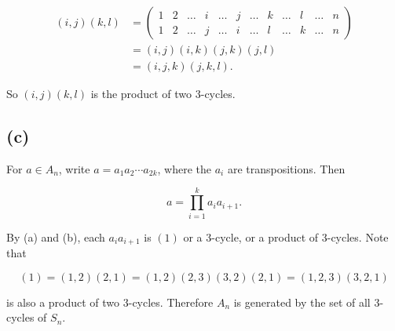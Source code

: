 \[\begin{matrix}
{\left( {i,j} \right)\left( {k,l} \right)} & {= \begin{pmatrix}
1 & 2 & \ldots & i & \ldots & j & \ldots & k & \ldots & l & \ldots & n \\
1 & 2 & \ldots & j & \ldots & i & \ldots & l & \ldots & k & \ldots & n
\end{pmatrix}} \\
 & {= \left( {i,j} \right)\left( {i,k} \right)\left( {j,k} \right)\left( {j,l} \right)} \\
 & {= \left( {i,j,k} \right)\left( {j,k,l} \right).}
\end{matrix}\]

So \(\left( {i,j} \right)\left( {k,l} \right)\) is the product of two 3-cycles.

\subsection{(c)}

For \(a \in A_{n}\), write \(a = a_{1}a_{2}\cdots a_{2k}\), where the \(a_{i}\) are transpositions. Then

\[a = \prod\limits_{i = 1}^{k}a_{i}a_{i + 1}.\]

By (a) and (b), each \(a_{i}a_{i + 1}\) is \((1)\) or a 3-cycle, or a product of 3-cycles. Note that

\[(1) = \left( {1,2} \right)\left( {2,1} \right) = \left( {1,2} \right)\left( {2,3} \right)\left( {3,2} \right)\left( {2,1} \right) = \left( {1,2,3} \right)\left( {3,2,1} \right)\]

is also a product of two 3-cycles. Therefore \(A_{n}\) is generated by the set of all 3-cycles of \(S_{n}\).

